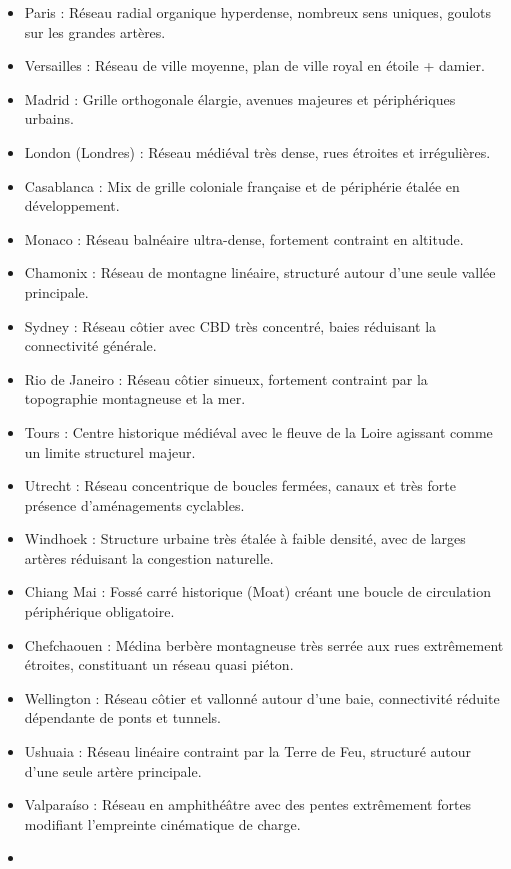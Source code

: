 \documentclass[10pt, a4paper]{article}
\providecommand{\tightlist}{}
\begin{document}
\begin{itemize}
\tightlist
\item
  Paris : Réseau radial organique hyperdense, nombreux sens uniques,
  goulots sur les grandes artères.
\item
  Versailles : Réseau de ville moyenne, plan de ville royal en étoile +
  damier.
\item
  Madrid : Grille orthogonale élargie, avenues majeures et périphériques
  urbains.
\item
  London (Londres) : Réseau médiéval très dense, rues étroites et
  irrégulières.
\item
  Casablanca : Mix de grille coloniale française et de périphérie étalée
  en développement.
\item
  Monaco : Réseau balnéaire ultra-dense, fortement contraint en
  altitude.
\item
  Chamonix : Réseau de montagne linéaire, structuré autour d'une seule
  vallée principale.
\item
  Sydney : Réseau côtier avec CBD très concentré, baies réduisant la
  connectivité générale.
\item
  Rio de Janeiro : Réseau côtier sinueux, fortement contraint par la
  topographie montagneuse et la mer.
\item
  Tours : Centre historique médiéval avec le fleuve de la Loire agissant
  comme un limite structurel majeur.
\item
  Utrecht : Réseau concentrique de boucles fermées, canaux et très forte
  présence d'aménagements cyclables.
\item
  Windhoek : Structure urbaine très étalée à faible densité, avec de
  larges artères réduisant la congestion naturelle.
\item
  Chiang Mai : Fossé carré historique (Moat) créant une boucle de
  circulation périphérique obligatoire.
\item
  Chefchaouen : Médina berbère montagneuse très serrée aux rues
  extrêmement étroites, constituant un réseau quasi piéton.
\item
  Wellington : Réseau côtier et vallonné autour d'une baie, connectivité
  réduite dépendante de ponts et tunnels.
\item
  Ushuaia : Réseau linéaire contraint par la Terre de Feu, structuré
  autour d'une seule artère principale.
\item
  Valparaíso : Réseau en amphithéâtre avec des pentes extrêmement fortes
  modifiant l'empreinte cinématique de charge.
\item

\end{itemize}
\end{document}
